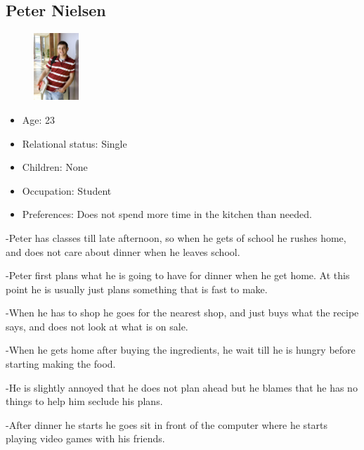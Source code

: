 \subsection{Peter Nielsen}
\begin{figure}[H]
	\includegraphics[width=0.15\textwidth]{Grafik/FoodPlanner/PersonaPeterNielsen}
	\label{PersonaHenrikJensen}
\end{figure}
\begin{itemize}
	\item Age: 23
	\item Relational status: Single
	\item Children: None
	\item Occupation: Student
	\item Preferences: Does not spend more time in the kitchen than needed.
\end{itemize}
-Peter has classes till late afternoon, so when he gets of school he rushes home, and does not care about dinner when he leaves school.

-Peter first plans what he is going to have for dinner when he get home. At this point he is usually just plans something that is fast to make.

-When he has to shop he goes for the nearest shop, and just buys what the recipe says, and does not look at what is on sale.

-When he gets home after buying the ingredients, he wait till he is hungry before starting making the food.

-He is slightly annoyed that he does not plan ahead but he blames that he has no things to help him seclude his plans.

-After dinner he starts he goes sit in front of the computer where he starts playing video games with his friends.

